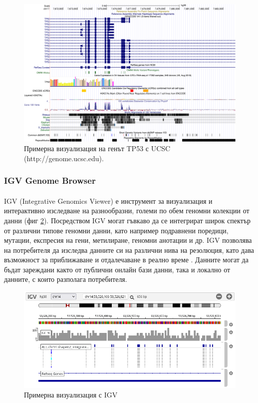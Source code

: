 \documentclass[pdftex,cyrillic,14pt,a4page,twoside,openright]{extreport}
\begin{document}
\begin{figure}[h]
  \centering
  \includegraphics[width=16cm]{figures/UCSC}
  \caption {Примерна визуализация на генът TP53 с UCSC (http://genome.ucsc.edu).}
  \label{fig:ucsc}
\end{figure}

\subsubsection{IGV Genome Browser}\label{sec:igv}
\paragraph{}
IGV (Integrative Genomics Viewer) е инструмент за визуализация и интерактивно изследване на разнообразни, големи по обем геномни колекции от данни (фиг \ref{fig:igv_example}). Посредством IGV могат гъвкаво да се интегрират широк спектър от различни типове геномни данни, като например подравнени поредици, мутации, експресия на гени, метилиране, геномни анотации и др. IGV позволява на потребителя да изследва данните си на различни нива на резолюция, като дава възможност за приближаване и отдалечаване в реално време \cite{robinson2011}\cite{robinson2017}. Данните могат да бъдат зареждани както от публични онлайн бази данни, така и локално от данните, с които разполага потребителя.

\begin{figure}[h]
  \centering
  \includegraphics[width=17cm]{figures/igv_example}
  \caption {Примерна визуализация с IGV}
  \label{fig:igv_example}
\end{figure}
\end{document}
